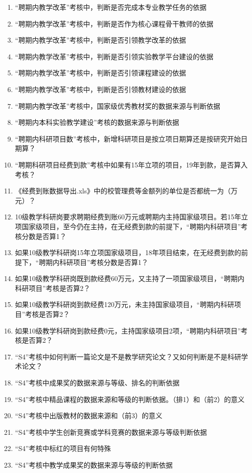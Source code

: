 \documentclass[UTF8,fontset=windowsnew]{ctexart}
\begin{document}
\begin{enumerate}
  \item ``聘期内教学改革''考核中，判断是否完成本专业教学任务的依据
  \item ``聘期内教学改革''考核中，判断是否作为核心课程骨干教师的依据
  \item ``聘期内教学改革''考核中，判断是否引领教学改革的依据
  \item ``聘期内教学改革''考核中，判断是否引领实验教学平台建设的依据
  \item ``聘期内教学改革''考核中，判断是否引领课程建设的依据
  \item ``聘期内教学改革''考核中，判断是否引领教材建设的依据
  \item ``聘期内教学改革''考核中，国家级优秀教材奖的数据来源与判断依据
  \item ``聘期内本科实验教学建设''考核的数据来源与判断依据
  \item ``聘期内科研项目数''考核中，新增科研项目是按立项日期算还是按研究开始日期算？
  \item ``聘期科研项目经费到款''考核中如果有15年立项的项目，19年到款，是否算入考核？
  \item 《经费到账数据导出.xls》中的校管理费等金额列的单位是否都统一为（万元）？
  \item 10级教学科研岗要求聘期经费到账60万元或聘期内主持国家级项目。若15年立项国家级项目，至今仍在主持，在无经费到款的前提下，``聘期内科研项目''考核分数是否算1？
  \item 如果10级教学科研岗15年立项国家级项目，18年项目结束，在无经费到款的前提下，``聘期内科研项目''考核分数是否算1？
  \item 如果10级教学科研岗既到款经费60万元，又主持了一项国家级项目，``聘期内科研项目''考核是否算2？
  \item 如果10级教学科研岗到款经费120万元，未主持国家级项目，``聘期内科研项目''考核是否算2？
  \item 如果10级教学科研岗到款经费0元，主持国家级项目2项，``聘期内科研项目''考核是否算2？
  \item ``S4''考核中如何判断一篇论文是不是教学研究论文？又如何判断是不是科研学术论文？
  \item ``S4''考核中成果奖的数据来源与等级、排名的判断依据
  \item ``S4''考核中精品课程的数据来源和等级的判断依据。（排1）和（前2）的意义
  \item ``S4''考核中出版教材的数据来源和（前3）的意义
  \item ``S4''考核中学生创新竞赛或学科竞赛的数据来源与等级判断依据
  \item ``S4''考核中标红的项目有何特殊
  \item ``S4''考核中教学成果奖的数据来源与等级的判断依据

\end{enumerate}
\end{document}
